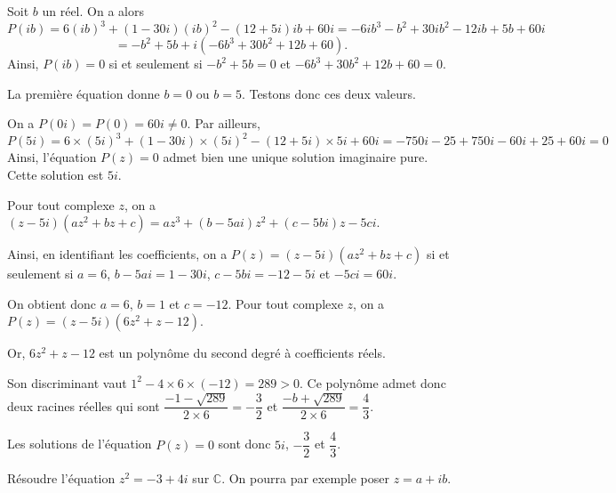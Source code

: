\documentclass[11pt,fleqn, openany]{book} %
\begin{document}
\begin{solution}Soit $b$ un réel. On a alors
\[P(ib)=6(ib)^3+(1-30i)(ib)^2-(12+5i)ib+60i=-6ib^3-b^2+30ib^2-12ib+5b+60i\]
\[=-b^2+5b+i(-6b^3+30b^2+12b+60).\]
Ainsi, $P(ib)=0$ si et seulement si $-b^2+5b=0$ et $-6b^3+30b^2+12b+60=0$.

La première équation donne $b=0$ ou $b=5$. Testons donc ces deux valeurs.

On a $P(0i)=P(0)=60i\neq 0$. Par ailleurs, 
\[P(5i)=6 \times (5i)^3+(1-30i) \times (5i)^2-(12+5i)\times 5i+60i=-750i-25+750i-60i+25+60i=0\]
Ainsi, l'équation $P(z)=0$ admet bien une unique solution imaginaire pure. Cette solution est $5i$.

Pour tout complexe $z$, on a $(z-5i)(az^2+bz+c)=az^3+(b-5ai)z^2+(c-5bi)z-5ci$.

Ainsi, en identifiant les coefficients, on a $P(z)=(z-5i)(az^2+bz+c)$ si et seulement si $a=6$, $b-5ai=1-30i$, $c-5bi=-12-5i$ et $-5ci=60i$.

On obtient donc $a=6$, $b=1$ et $c=-12$. Pour tout complexe $z$, on a $P(z)=(z-5i)(6z^2+z-12)$.

Or, $6z^2+z-12$ est un polynôme du second degré à coefficients réels. 

Son discriminant vaut $1^2-4\times 6 \times (-12)=289>0$. Ce polynôme admet donc deux racines réelles qui sont $\dfrac{-1-\sqrt{289}}{2\times 6}=-\dfrac{3}{2}$ et $\dfrac{-b+\sqrt{289}}{2\times 6}=\dfrac{4}{3}$.

Les solutions de l'équation $P(z)=0$ sont donc $5i$, $-\dfrac{3}{2}$ et $\dfrac{4}{3}$.
\end{solution}


\begin{exercise}[topic=cpx01]Résoudre l'équation $z^2=-3+4i$ sur $\mathbb{C}$. On pourra par exemple poser $z=a+ib$.\end{exercise}
\end{document}
